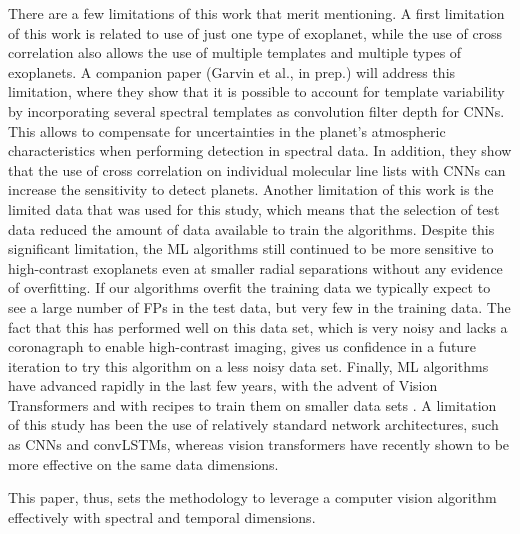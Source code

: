 \documentclass{aa}
\begin{document}
There are a few limitations of this work that merit mentioning.
A first limitation of this work is related to use of just one type of exoplanet, while the use of cross correlation also allows the use of multiple templates and multiple types of exoplanets.
A companion paper (Garvin et al., in prep.) %
will address this limitation, where they show that it is possible to account for template variability by incorporating several spectral templates as convolution filter depth for CNNs. 
This allows to compensate for uncertainties in the planet's atmospheric characteristics when performing detection in spectral data.
In addition, they show that the use of cross correlation on individual molecular line lists with CNNs can increase the sensitivity to detect planets.
Another limitation of this work is the limited data that was used for this study, which means that the selection of test data reduced the amount of data available to train the algorithms.
Despite this significant limitation, the ML algorithms still continued to be more sensitive to high-contrast exoplanets even at smaller radial separations without any evidence of overfitting.
If our algorithms overfit the training data we typically expect to see a large number of FPs in the test data, but very few in the training data. 
The fact that this has performed well on this data set, which is very noisy and lacks a coronagraph to enable high-contrast imaging, gives us confidence in a future iteration to try this algorithm on a less noisy data set.
Finally, ML algorithms have advanced rapidly in the last few years, with the advent of Vision Transformers \citep{2020ViT} and with recipes to train them on smaller data sets \citep[e.g.,][]{2022Gani}.
A limitation of this study has been the use of relatively standard network architectures, such as CNNs and convLSTMs, whereas vision transformers have recently shown to be more effective on the same data dimensions.

This paper, thus, sets the methodology to leverage a computer vision algorithm effectively with spectral and temporal dimensions.
\end{document}
